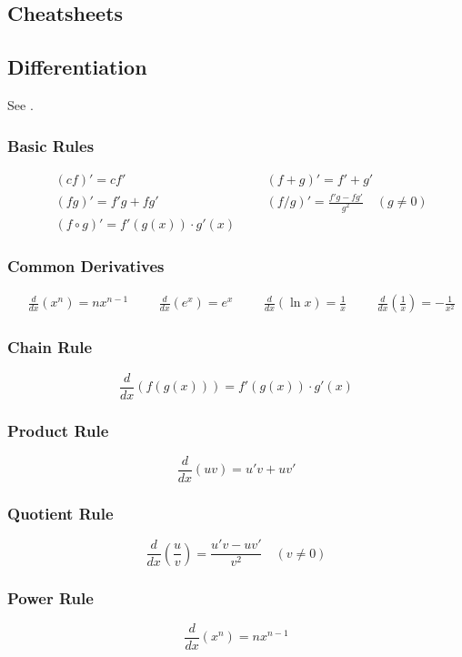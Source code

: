 \documentclass[11pt,a4paper]{book}
\theoremstyle{definition}\newtheorem{definition}{Definition}
\theoremstyle{definition}\newtheorem{fact}{Fact}
\theoremstyle{definition}\newtheorem{remark}{Remark}
\theoremstyle{definition}\newtheorem{ex}{Ex.}
\theoremstyle{definition}\newtheorem{project}{Project}
\theoremstyle{definition}\newtheorem{problem}{Problem}
\theoremstyle{definition}\newtheorem{example}{Example}
\numberwithin{theorem}{section}
\numberwithin{corollary}{chapter}
\numberwithin{assumption}{chapter}
\numberwithin{definition}{chapter}
\numberwithin{prop}{chapter}
\numberwithin{notation}{chapter}
\numberwithin{problem}{chapter}
\numberwithin{example}{chapter}
\numberwithin{fact}{chapter}
\numberwithin{ex}{chapter}
\begin{document}
	\begin{appendices}
	
	\chapter{Cheatsheets}
		\section{Differentiation}
	See \citet[Ch. 5]{springcamp}.
	\subsection*{Basic Rules}
	\begin{align*}
		&(cf)' = cf' &&
		&(f+g)' = f' + g' \\
		&(fg)' = f'g + fg' &&
		&(f/g)' = \frac{f'g - fg'}{g^2} \quad (g \neq 0) \\
		&(f \circ g)' = f'(g(x)) \cdot g'(x)
	\end{align*}
	
	\subsection*{Common Derivatives}
	\begin{align*}
		&\frac{d}{dx} (x^n) = nx^{n-1} &&
		&\frac{d}{dx} (e^x) = e^x &&
		&\frac{d}{dx} (\ln x) = \frac{1}{x} &&
		&\frac{d}{dx} \left(\frac{1}{x}\right) = -\frac{1}{x^2}
	\end{align*}
	
	\subsection*{Chain Rule}
	\[
	\frac{d}{dx} (f(g(x))) = f'(g(x)) \cdot g'(x)
	\]
	
	\subsection*{Product Rule}
	\[
	\frac{d}{dx} (uv) = u'v + uv'
	\]
	
	\subsection*{Quotient Rule}
	\[
	\frac{d}{dx} \left( \frac{u}{v} \right) = \frac{u'v - uv'}{v^2} \quad (v \neq 0)
	\]
	
	\subsection*{Power Rule}
	\[
	\frac{d}{dx} (x^n) = nx^{n-1}
	\]
	

\end{appendices}
\end{document}

